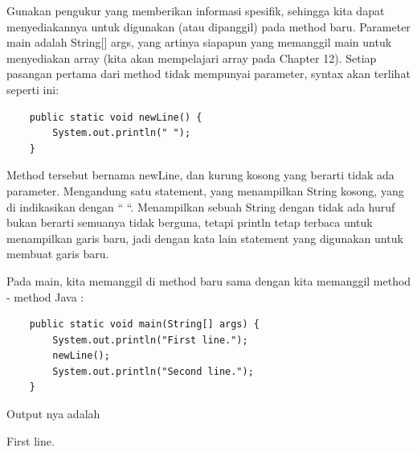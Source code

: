 Gunakan pengukur yang memberikan informasi spesifik, sehingga kita dapat menyediakannya untuk digunakan (atau dipanggil) pada method baru.
Parameter main adalah String[] args, yang artinya siapapun yang memanggil main untuk menyediakan array (kita akan mempelajari array pada Chapter 12). Setiap pasangan pertama dari method tidak mempunyai parameter, syntax akan terlihat seperti ini:\newline
\begin{lstlisting}	
	public static void newLine() {	
		System.out.println(" ");	
	}
\end{lstlisting}	
Method tersebut bernama newLine, dan kurung kosong yang berarti tidak ada parameter. Mengandung satu statement, yang menampilkan String kosong, yang di indikasikan dengan “ “. Menampilkan sebuah String dengan tidak ada huruf bukan berarti semuanya tidak berguna, tetapi println tetap terbaca untuk menampilkan garis baru, jadi dengan kata lain statement yang digunakan untuk membuat garis baru.

Pada main, kita memanggil di method baru sama dengan kita memanggil method - method Java :\newline
\begin{lstlisting}
	public static void main(String[] args) {
		System.out.println("First line.");
		newLine();
		System.out.println("Second line.");
	}
\end{lstlisting}
Output nya adalah \newline

	First line.\newline

